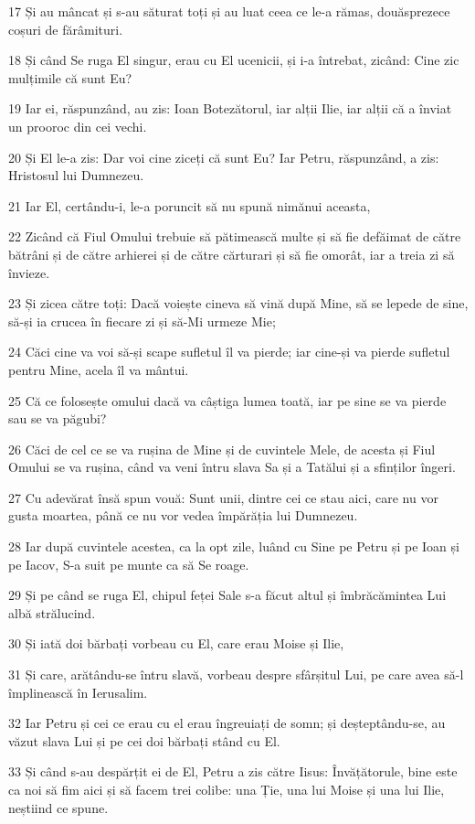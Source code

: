 \par 17 Și au mâncat și s-au săturat toți și au luat ceea ce le-a rămas, douăsprezece coșuri de fărâmituri.
\par 18 Și când Se ruga El singur, erau cu El ucenicii, și i-a întrebat, zicând: Cine zic mulțimile că sunt Eu?
\par 19 Iar ei, răspunzând, au zis: Ioan Botezătorul, iar alții Ilie, iar alții că a înviat un prooroc din cei vechi.
\par 20 Și El le-a zis: Dar voi cine ziceți că sunt Eu? Iar Petru, răspunzând, a zis: Hristosul lui Dumnezeu.
\par 21 Iar El, certându-i, le-a poruncit să nu spună nimănui aceasta,
\par 22 Zicând că Fiul Omului trebuie să pătimească multe și să fie defăimat de către bătrâni și de către arhierei și de către cărturari și să fie omorât, iar a treia zi să învieze.
\par 23 Și zicea către toți: Dacă voiește cineva să vină după Mine, să se lepede de sine, să-și ia crucea în fiecare zi și să-Mi urmeze Mie;
\par 24 Căci cine va voi să-și scape sufletul îl va pierde; iar cine-și va pierde sufletul pentru Mine, acela îl va mântui.
\par 25 Că ce folosește omului dacă va câștiga lumea toată, iar pe sine se va pierde sau se va păgubi?
\par 26 Căci de cel ce se va rușina de Mine și de cuvintele Mele, de acesta și Fiul Omului se va rușina, când va veni întru slava Sa și a Tatălui și a sfinților îngeri.
\par 27 Cu adevărat însă spun vouă: Sunt unii, dintre cei ce stau aici, care nu vor gusta moartea, până ce nu vor vedea împărăția lui Dumnezeu.
\par 28 Iar după cuvintele acestea, ca la opt zile, luând cu Sine pe Petru și pe Ioan și pe Iacov, S-a suit pe munte ca să Se roage.
\par 29 Și pe când se ruga El, chipul feței Sale s-a făcut altul și îmbrăcămintea Lui albă strălucind.
\par 30 Și iată doi bărbați vorbeau cu El, care erau Moise și Ilie,
\par 31 Și care, arătându-se întru slavă, vorbeau despre sfârșitul Lui, pe care avea să-l împlinească în Ierusalim.
\par 32 Iar Petru și cei ce erau cu el erau îngreuiați de somn; și deșteptându-se, au văzut slava Lui și pe cei doi bărbați stând cu El.
\par 33 Și când s-au despărțit ei de El, Petru a zis către Iisus: Învățătorule, bine este ca noi să fim aici și să facem trei colibe: una Ție, una lui Moise și una lui Ilie, neștiind ce spune.
